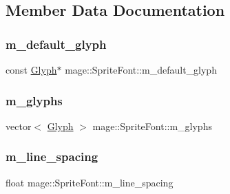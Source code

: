 \subsection{Member Data Documentation}
\hypertarget{classmage_1_1_sprite_font_ad25667d3bfb539b71b39124fdc8ed6d6}{}\label{classmage_1_1_sprite_font_ad25667d3bfb539b71b39124fdc8ed6d6} 
\subsubsection{\texorpdfstring{m\+\_\+default\+\_\+glyph}{m\_default\_glyph}}
{\footnotesize\ttfamily const \hyperlink{structmage_1_1_glyph}{Glyph}$\ast$ mage\+::\+Sprite\+Font\+::m\+\_\+default\+\_\+glyph\hspace{0.3cm}{\ttfamily [private]}}

\hypertarget{classmage_1_1_sprite_font_acf4efc927a2ca3fc0eb297ed080ddfbb}{}\label{classmage_1_1_sprite_font_acf4efc927a2ca3fc0eb297ed080ddfbb} 
\subsubsection{\texorpdfstring{m\+\_\+glyphs}{m\_glyphs}}
{\footnotesize\ttfamily vector$<$ \hyperlink{structmage_1_1_glyph}{Glyph} $>$ mage\+::\+Sprite\+Font\+::m\+\_\+glyphs\hspace{0.3cm}{\ttfamily [private]}}

\hypertarget{classmage_1_1_sprite_font_a2b6de0c210a7cf5c72dd1bb69bff7a3b}{}\label{classmage_1_1_sprite_font_a2b6de0c210a7cf5c72dd1bb69bff7a3b} 
\subsubsection{\texorpdfstring{m\+\_\+line\+\_\+spacing}{m\_line\_spacing}}
{\footnotesize\ttfamily float mage\+::\+Sprite\+Font\+::m\+\_\+line\+\_\+spacing\hspace{0.3cm}{\ttfamily [private]}}

